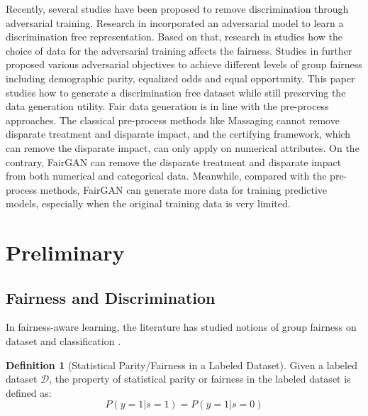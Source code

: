 \documentclass[sigconf]{acmart}
\theoremstyle{definition}
\newtheorem{definition}{Definition}
\begin{document}
Recently, several studies have been proposed to remove discrimination through adversarial training. Research in \cite{Edwards2015Censoring} incorporated an adversarial model to learn a discrimination free representation. Based on that, research in \cite{Beutel2017Data}  studies how the choice of data for the adversarial training affects the fairness. Studies in \cite{Madras2018Learning,Zhang2018Mitigating} further proposed various adversarial objectives to achieve different levels of group fairness including demographic parity, equalized odds and equal opportunity. This paper studies how to generate a discrimination free dataset while still preserving the data generation utility. Fair data generation is in line with the pre-process approaches. The classical pre-process methods like Massaging cannot remove disparate treatment and disparate impact, and the certifying framework, which can remove the disparate impact, can only apply on numerical attributes. On the contrary, FairGAN can remove the disparate treatment and disparate impact from both numerical and categorical data. Meanwhile, compared with the pre-process methods, FairGAN can generate more data for training predictive models, especially when the original training data is very limited.

\section{Preliminary}

\subsection{Fairness and Discrimination}

In fairness-aware learning, the literature has studied notions of group fairness on dataset and classification \cite{Hardt2016Equality,Kamiran2012Data}. 

\begin{definition}[Statistical Parity/Fairness in a Labeled Dataset]
	Given a labeled dataset $\mathcal{D}$, the property of statistical parity or fairness in the labeled dataset is defined as:
	\[
		P(y=1|s=1)=P(y=1|s=0)
	\]
\end{definition}
\end{document}
